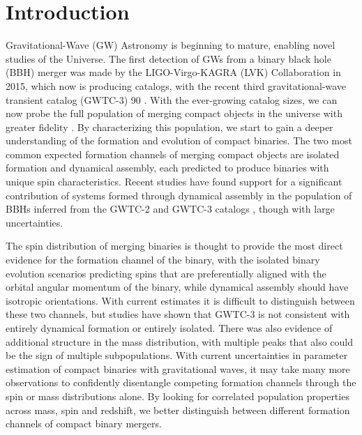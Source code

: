 \section{Introduction} \label{sec:intro}

Gravitational-Wave (GW) Astronomy is beginning to mature, enabling novel studies of the Universe. The first detection of GWs from a binary black hole (BBH) merger was made by the LIGO-Virgo-KAGRA (LVK) Collaboration in 2015, which now is producing catalogs, with the recent third gravitational-wave transient catalog (GWTC-3) 90 \citep{2015CQGra..32g4001L,2015CQGra..32b4001A,2021PTEP.2021eA102A,2016PhRvL.116f1102A,2019PhRvX...9c1040A,2021PhRvX..11b1053A,2021arXiv211103606T}. With the ever-growing catalog sizes, we can now probe the full population of merging compact objects in the universe with greater fidelity \citep{2019ApJ...882L..24A,2021ApJ...913L...7A,2021arXiv211103634T}. By characterizing this population, we start to gain a deeper understanding of the formation and evolution of compact binaries. The two most common expected formation channels of merging compact objects are isolated formation and dynamical assembly, each predicted to produce binaries with unique spin characteristics. Recent studies have found support for a significant contribution of systems formed through dynamical assembly in the population of BBHs inferred from the GWTC-2 and GWTC-3 catalogs \citep{2021ApJ...913L...7A,2021PhRvD.104h3010R,2021arXiv211103634T,2022ApJ...937L..13C,2021ApJ...921L..15G,2022arXiv220902206T,2022arXiv221012834E}, though with large uncertainties. 

The spin distribution of merging binaries is thought to provide the most direct evidence for the formation channel of the binary, with the isolated binary evolution scenarios predicting spins that are preferentially aligned with the orbital angular momentum of the binary, while dynamical assembly should have isotropic orientations. With current estimates it is difficult to distinguish between these two channels, but studies have shown that GWTC-3 is not consistent with entirely dynamical formation or entirely isolated. There was also evidence of additional structure in the mass distribution, with multiple peaks that also could be the sign of multiple subpopulations. With current uncertainties in parameter estimation of compact binaries with gravitational waves, it may take many more observations to confidently disentangle competing formation channels through the spin or mass distributions alone. By looking for correlated population properties across mass, spin and redshift, we better distinguish between different formation channels of compact binary mergers. 

